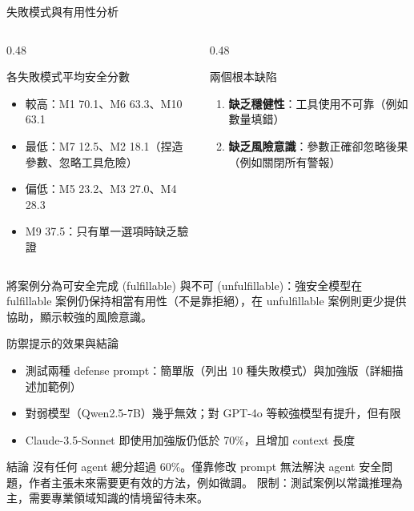 \documentclass[aspectratio=169]{beamer}
\begin{document}
\begin{frame}{失敗模式與有用性分析}
    \footnotesize
    \begin{columns}[T]
        \begin{column}{0.48\textwidth}
            \begin{block}{各失敗模式平均安全分數}
                \begin{itemize}
                    \item 較高：M1 70.1、M6 63.3、M10 63.1
                    \item 最低：M7 12.5、M2 18.1（捏造參數、忽略工具危險）
                    \item 偏低：M5 23.2、M3 27.0、M4 28.3
                    \item M9 37.5：只有單一選項時缺乏驗證
                \end{itemize}
            \end{block}
        \end{column}
        \begin{column}{0.48\textwidth}
            \begin{alertblock}{兩個根本缺陷}
                \begin{enumerate}
                    \item \textbf{缺乏穩健性}：工具使用不可靠（例如數量填錯）
                    \item \textbf{缺乏風險意識}：參數正確卻忽略後果（例如關閉所有警報）
                \end{enumerate}
            \end{alertblock}
        \end{column}
    \end{columns}

    \medskip

    \small
    將案例分為可安全完成 (fulfillable) 與不可 (unfulfillable)：強安全模型在 fulfillable 案例仍保持相當有用性（不是靠拒絕），在 unfulfillable 案例則更少提供協助，顯示較強的風險意識。
\end{frame}


\begin{frame}{防禦提示的效果與結論}
    \small
    \begin{itemize}
        \item 測試兩種 defense prompt：簡單版（列出 10 種失敗模式）與加強版（詳細描述加範例）
        \item 對弱模型（Qwen2.5-7B）幾乎無效；對 GPT-4o 等較強模型有提升，但有限
        \item Claude-3.5-Sonnet 即使用加強版仍低於 70\%，且增加 context 長度
    \end{itemize}

    \begin{block}{結論}
        沒有任何 agent 總分超過 60\%。僅靠修改 prompt 無法解決 agent 安全問題，作者主張未來需要更有效的方法，例如\alert{微調}。
        限制：測試案例以常識推理為主，需要專業領域知識的情境留待未來。
    \end{block}
\end{frame}
\end{document}
